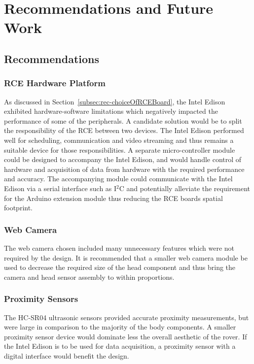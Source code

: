\chapter{Recommendations and Future Work}
\label{chap:recommendationsAndFutureWork}
  \section{Recommendations}
    \subsection{RCE Hardware Platform}
      As discussed in Section~\ref{subsec:rec-choiceOfRCEBoard}, the Intel Edison exhibited hardware-software limitations which negatively impacted the performance of some of the peripherals. A candidate solution would be to split the responsibility of the RCE between two devices. The Intel Edison performed well for scheduling, communication and video streaming and thus remains a suitable device for those responsibilities. A separate micro-controller module could be designed to accompany the Intel Edison, and would handle control of hardware and acquisition of data from hardware with the required performance and accuracy. The accompanying module could communicate with the Intel Edison via a serial interface such as I$^2$C and potentially alleviate the requirement for the Arduino extension module thus reducing the RCE boards spatial footprint.
      
    \subsection{Web Camera}
      The web camera chosen included many unnecessary features which were not required by the design. It is recommended that a smaller web camera module be used to decrease the required size of the head component and thus bring the camera and head sensor assembly to within proportions.
      
    \subsection{Proximity Sensors}
      The HC-SR04 ultrasonic sensors provided accurate proximity measurements, but were large in comparison to the majority of the body components. A smaller proximity sensor device would dominate less the overall aesthetic of the rover. If the Intel Edison is to be used for data acquisition, a proximity sensor with a digital interface would benefit the design.
      
